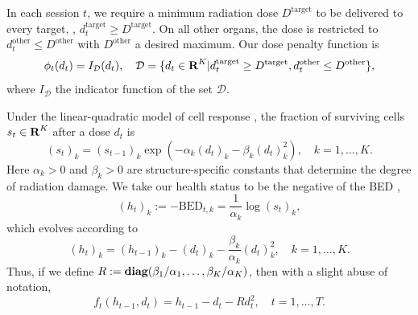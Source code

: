 \documentclass[12pt]{article}
\begin{document}
In each session $t$, we require a minimum radiation dose $D^{\text{target}}$ to be delivered to every target, \ie, $d_t^{\text{target}} \geq D^{\text{target}}$. On all other organs, the dose is restricted to $d_t^{\text{other}} \leq D^{\text{other}}$ with $D^{\text{other}}$ a desired maximum. Our dose penalty function is
\[
\phi_t(d_t) = I_{\mathcal{D}}(d_t), \quad \mathcal{D} = \{d_t \in {\mbox{\bf R}}^K | d_t^{\text{target}} \geq D^{\text{target}}, d_t^{\text{other}} \leq D^{\text{other}} \},
\]
where $I_{\mathcal{D}}$ the indicator function of the set $\mathcal{D}$.

Under the linear-quadratic model of cell response \cite{HallGiaccia:2019}, the fraction of surviving cells $s_t \in {\mbox{\bf R}}^K$ after a dose $d_t$ is
\[
(s_t)_k = (s_{t-1})_k \exp(-\alpha_k (d_t)_k - \beta_k (d_t)_k^2), \quad k = 1,\ldots,K.
\]
Here $\alpha_k > 0$ and $\beta_k > 0$ are structure-specific constants that determine the degree of radiation damage. %
We take our health status to be the negative of the BED \cite{Fowler:2010},
\[
	(h_t)_k := -\text{BED}_{t,k} = \frac{1}{\alpha_k}\log(s_t)_k,
\]
which evolves according to
\[
	(h_t)_k = (h_{t-1})_k - (d_t)_k - \frac{\beta_k}{\alpha_k}(d_t)_k^2, \quad k = 1,\ldots,K.
\]
Thus, if we define $R := \mathop{\bf diag}(\beta_1/\alpha_1,\ldots,\beta_K/\alpha_K)$, then with a slight abuse of notation,
\[
	f_t(h_{t-1},d_t) = h_{t-1} - d_t - Rd_t^2, \quad t = 1,\ldots,T.
\]
\end{document}
